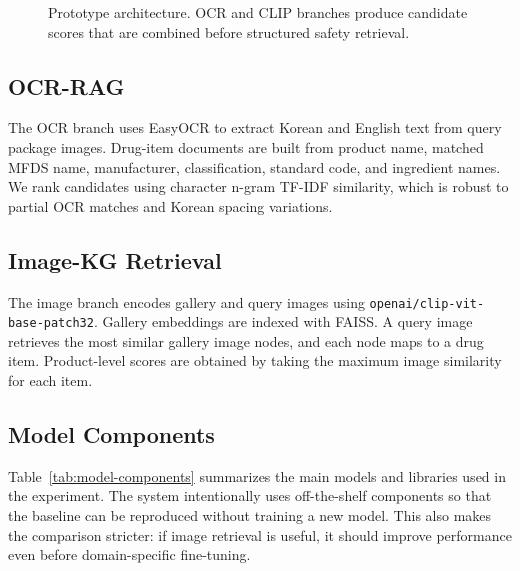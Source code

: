 \documentclass[sigconf,screen,nonacm]{acmart}
\begin{document}
\begin{figure}[t]
\centering
{}
\caption{Prototype architecture. OCR and CLIP branches produce candidate scores that are combined before structured safety retrieval.}
\label{fig:architecture}
\end{figure}

\subsection{OCR-RAG}
The OCR branch uses EasyOCR to extract Korean and English text from query package images. Drug-item documents are built from product name, matched MFDS name, manufacturer, classification, standard code, and ingredient names. We rank candidates using character n-gram TF-IDF similarity, which is robust to partial OCR matches and Korean spacing variations.

\subsection{Image-KG Retrieval}
The image branch encodes gallery and query images using \texttt{openai/clip-vit-base-patch32}. Gallery embeddings are indexed with FAISS. A query image retrieves the most similar gallery image nodes, and each node maps to a drug item. Product-level scores are obtained by taking the maximum image similarity for each item.

\subsection{Model Components}
Table~\ref{tab:model-components} summarizes the main models and libraries used in the experiment. The system intentionally uses off-the-shelf components so that the baseline can be reproduced without training a new model. This also makes the comparison stricter: if image retrieval is useful, it should improve performance even before domain-specific fine-tuning.
\end{document}
